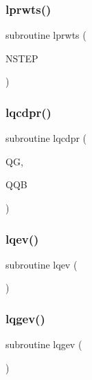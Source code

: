 \subsubsection{\texorpdfstring{lprwts()}{lprwts()}}
{\footnotesize\ttfamily subroutine lprwts (\begin{DoxyParamCaption}\item[{}]{N\+S\+T\+EP }\end{DoxyParamCaption})}

\mbox{\label{djangoh__l_8f_a028774669b878dc254be7adc6a8b71fc}} 
\subsubsection{\texorpdfstring{lqcdpr()}{lqcdpr()}}
{\footnotesize\ttfamily subroutine lqcdpr (\begin{DoxyParamCaption}\item[{}]{QG,  }\item[{}]{Q\+QB }\end{DoxyParamCaption})}

\mbox{\label{djangoh__l_8f_a01abaac24ae901949706dffdf91c7743}} 
\subsubsection{\texorpdfstring{lqev()}{lqev()}}
{\footnotesize\ttfamily subroutine lqev (\begin{DoxyParamCaption}{ }\end{DoxyParamCaption})}

\mbox{\label{djangoh__l_8f_a23666489567c7a0e59195b6fd2173242}} 
\subsubsection{\texorpdfstring{lqgev()}{lqgev()}}
{\footnotesize\ttfamily subroutine lqgev (\begin{DoxyParamCaption}{ }\end{DoxyParamCaption})}

